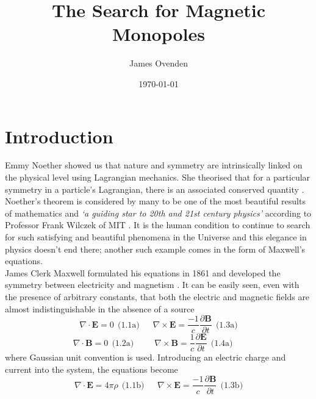 \documentclass[twocolumn, 10pt]{article}
\begin{document}
\title{\textbf{The Search for Magnetic Monopoles}}
\author{James Ovenden}
\date{\today}
\maketitle

\tableofcontents

\section{Introduction}
Emmy Noether showed us that nature and symmetry are intrinsically linked on the physical level using Lagrangian mechanics. She theorised that for a particular symmetry in a particle's Lagrangian, there is an associated conserved quantity \cite{bob2017purdy}. Noether's theorem is considered by many to be one of the most beautiful results of mathematics and \textit{`a guiding star to 20th and 21st century physics'} according to Professor Frank Wilczek of MIT \cite{scinews}. It is the human condition to continue to search for such satisfying and beautiful phenomena in the Universe and this elegance in physics doesn't end there; another such example comes in the form of Maxwell's equations. \\
\indent James Clerk Maxwell formulated his equations in 1861 and developed the symmetry between electricity and magnetism \cite{maxwell1861li}. It can be easily seen, even with the presence of arbitrary constants, that both the electric and magnetic fields are almost indistinguishable in the absence of a source 
\begin{equation*}
\nabla \cdotp \mathbf{E} = 0   \ \ \text{(1.1a)} \ \ \ \ \ \ \  \nabla \times \mathbf{E} = \frac{-1}{c}\frac{\partial \mathbf{B}}{\partial t} \ \  \text{(1.3a)}
\end{equation*}
\begin{equation*}
\ \ \ \ \ \ \ \ \ \ \ \ \ \nabla \cdotp \mathbf{B} = 0   \ \ \text{(1.2a)} \ \ \ \ \ \ \ \ \ \ \ \nabla \times \mathbf{B} = \frac{1}{c} \frac{\partial \mathbf{E}}{\partial t} \ \ \text{(1.4a)} \ \ \ \ \ \ \ \ \ \ \ \ \ \ \ \ \ \ \ 
\end{equation*} 
where Gaussian unit convention is used. Introducing an electric charge and current into the system, the equations become \cite{maxwell1861li, martin2015phys}
\begin{equation*}
\nabla \cdotp \mathbf{E} = 4\pi\rho  \ \ \text{(1.1b)} \ \ \ \ \ \ \  \nabla \times \mathbf{E} = \frac{-1}{c}\frac{\partial \mathbf{B}}{\partial t} \ \  \text{(1.3b)}
\end{equation*}
\end{document}
